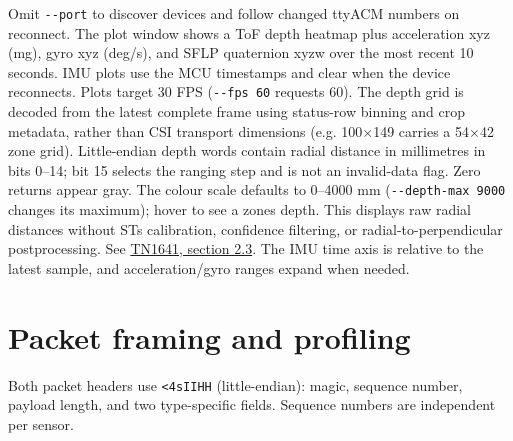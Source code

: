\documentclass[10pt,a4paper,oneside]{report}
\begin{document}
Omit \texttt{-\allowbreak{}-\allowbreak{}port} to discover devices and follow changed ttyACM numbers on reconnect. The plot window shows a ToF depth heatmap plus acceleration xyz (mg), gyro xyz (deg/s), and SFLP quaternion xyzw over the most recent 10 seconds. IMU plots use the MCU timestamps and clear when the device reconnects. Plots target 30 FPS (\texttt{-\allowbreak{}-\allowbreak{}fps 60} requests 60). The depth grid is decoded from the latest complete frame using status-row binning and crop metadata, rather than CSI transport dimensions (e.g. 100×149 carries a 54×42 zone grid). Little-endian depth words contain radial distance in millimetres in bits 0--14; bit 15 selects the ranging step and is not an invalid-data flag. Zero returns appear gray. The colour scale defaults to 0--4000 mm (\texttt{-\allowbreak{}-\allowbreak{}depth-\allowbreak{}max 9000} changes its maximum); hover to see a zone\textquotesingle s depth. This displays raw radial distances without ST\textquotesingle s calibration, confidence filtering, or radial-to-perpendicular postprocessing. See \href{https://www.st.com/resource/en/technical_note/tn1641-vl53l9cx-postprocessing-pipeline-stmicroelectronics.pdf\#page=5}{TN1641, section 2.3}. The IMU time axis is relative to the latest sample, and acceleration/gyro ranges expand when needed.

\section{Packet framing and profiling}\label{wiki-tools-streaming-and-diagnostics--packet-framing-and-profiling}

Both packet headers use \texttt{<4sIIHH} (little-endian): magic, sequence number, payload length, and two type-specific fields. Sequence numbers are independent per sensor.
\end{document}
